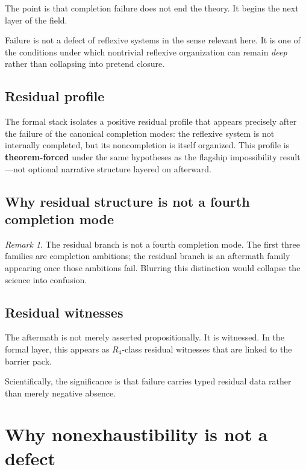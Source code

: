 \documentclass[11pt]{article}
\theoremstyle{plain}
\theoremstyle{definition}
\theoremstyle{remark}
\newtheorem{remark}[theorem]{Remark}
\begin{document}
The point is that completion failure does not end the theory. It begins the next layer of the field.

\begin{keybox}[title=Aftermath principle]
Failure is not a defect of reflexive systems in the sense relevant here. It is one of the conditions under which nontrivial reflexive organization can remain \emph{deep} rather than collapsing into pretend closure.
\end{keybox}

\subsection{Residual profile}

The formal stack isolates a positive residual profile that appears precisely after the failure of the canonical completion modes: the reflexive system is not internally completed, but its noncompletion is itself organized. This profile is \textbf{theorem-forced} under the same hypotheses as the flagship impossibility result---not optional narrative structure layered on afterward.

\subsection{Why residual structure is not a fourth completion mode}

\begin{remark}
The residual branch is not a fourth completion mode. The first three families are completion ambitions; the residual branch is an aftermath family appearing once those ambitions fail. Blurring this distinction would collapse the science into confusion.
\end{remark}

\subsection{Residual witnesses}

The aftermath is not merely asserted propositionally. It is witnessed. In the formal layer, this appears as \(R_4\)-class residual witnesses that are linked to the barrier pack.

Scientifically, the significance is that failure carries typed residual data rather than merely negative absence.

\section{Why nonexhaustibility is not a defect}
\end{document}
